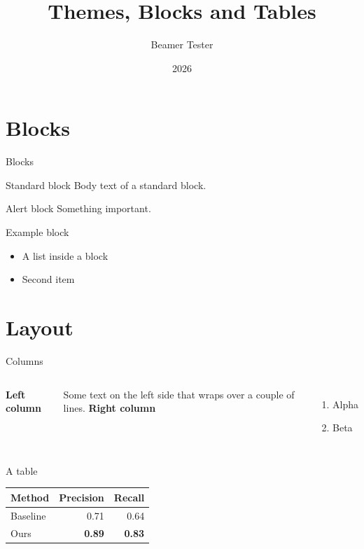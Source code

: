 \documentclass{beamer}
\title[Themed]{Themes, Blocks and Tables}
\author[B.~Tester]{Beamer Tester}
\institute[TU]{Test University}
\date{2026}
\begin{document}
\begin{frame}
  \titlepage
\end{frame}

\section{Blocks}
\begin{frame}{Blocks}
  \begin{block}{Standard block}
    Body text of a standard block.
  \end{block}
  \begin{alertblock}{Alert block}
    Something important.
  \end{alertblock}
  \begin{exampleblock}{Example block}
    \begin{itemize}
      \item A list inside a block
      \item Second item
    \end{itemize}
  \end{exampleblock}
\end{frame}

\section{Layout}
\begin{frame}{Columns}
  \begin{columns}[T]
    \textbf{Left column}

    Some text on the left side that wraps over a couple of lines.
    \textbf{Right column}
    \begin{enumerate}
      \item Alpha
      \item Beta
    \end{enumerate}
  \end{columns}
\end{frame}

\begin{frame}{A table}
  \centering
  \begin{tabular}{l r r}
    \hline
    Method & Precision & Recall \\
    \hline
    Baseline & 0.71 & 0.64 \\
    Ours     & \textbf{0.89} & \textbf{0.83} \\
    \hline
  \end{tabular}
\end{frame}
\end{document}
